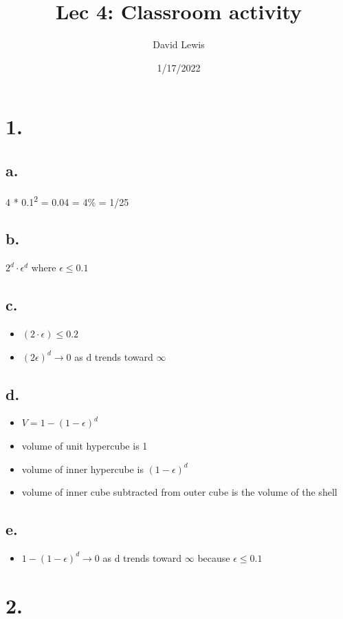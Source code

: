 \documentclass[11pt]{article}
\author{David Lewis}
\date{1/17/2022}
\title{Lec 4: Classroom activity}
\begin{document}
\maketitle
\section*{1.}
\label{sec:org065bafd}
\subsection*{a.}
\label{sec:orgb099e59}
4 * 0.1\textsuperscript{2} = 0.04 = 4\% = 1/25
\subsection*{b.}
\label{sec:orgf71ce7e}
\(2^d \cdot \epsilon^d\) where \(\epsilon \le 0.1\)
\subsection*{c.}
\label{sec:org82b3e3b}
\begin{itemize}
\item \((2 \cdot \epsilon) \le 0.2\)
\item \((2\epsilon)^d \rightarrow 0\) as d trends toward \(\infty\)
\end{itemize}
\subsection*{d.}
\label{sec:orgdf76e36}
\begin{itemize}
\item \(V = 1 - (1-\epsilon)^d\)
\item volume of unit hypercube is 1
\item volume of inner hypercube is \((1-\epsilon)^d\)
\item volume of inner cube subtracted from outer cube is the volume of the shell
\end{itemize}
\subsection*{e.}
\label{sec:orgdb7ef39}
\begin{itemize}
\item \(1 - (1-\epsilon)^d \rightarrow 0\) as d trends toward \(\infty\) because \(\epsilon \le 0.1\)
\end{itemize}
\section*{2.}
\label{sec:org7500c1d}
\end{document}
